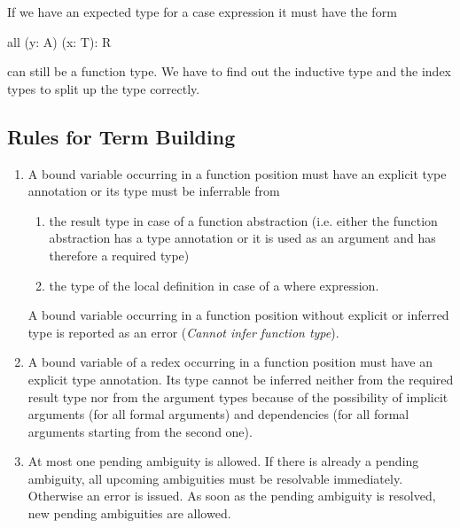If we have an expected type for a case expression it must have the form
\begin{alba}
    all (y: A) (x: T): R
\end{alba}

 can still be a function type. We have to find out the inductive type
and the index types to split up the type correctly.






\vskip 5mm
\subsection{Rules for Term Building}

\begin{enumerate}

\item A bound variable occurring in a function position must have an explicit
type annotation or its type must be inferrable from

    \begin{enumerate}

    \item the result type in case of a function abstraction (i.e. either the
    function abstraction has a type annotation or it is used as an argument and
    has therefore a required type)

    \item the type of the local definition in case of a where expression.
    \end{enumerate}

A bound variable occurring in a function position without explicit or inferred
type is reported as an error ({\em Cannot infer function type}).

\item A bound variable of a redex occurring in a function position must have an
explicit type annotation. Its type cannot be inferred neither from the required
result type nor from the argument types because of the possibility of implicit
arguments (for all formal arguments) and dependencies (for all formal arguments
starting from the second one).

\item At most one pending ambiguity is allowed. If there is already a pending
ambiguity, all upcoming ambiguities must be resolvable immediately. Otherwise an
error is issued. As soon as the pending ambiguity is resolved, new pending
ambiguities are allowed.

\end{enumerate}





